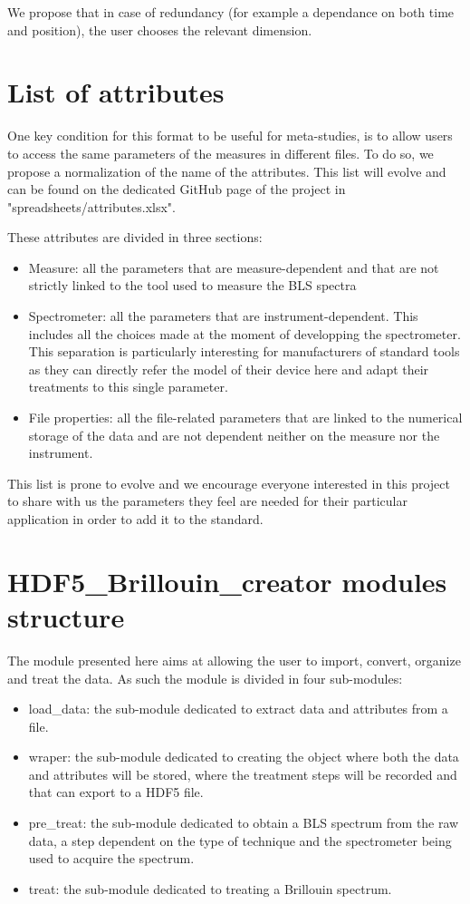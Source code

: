 \documentclass[11pt]{article}
\begin{document}
  We propose that in case of redundancy (for example a dependance on both time and position), the user chooses the relevant dimension.

\section{List of attributes}

One key condition for this format to be useful for meta-studies, is to allow users to access the same parameters of the measures in different files. To do so, we propose a normalization of the name of the attributes. This list will evolve and can be found on the dedicated GitHub page of the project in "spreadsheets/attributes.xlsx".

These attributes are divided in three sections:
\begin{itemize}
  \item Measure: all the parameters that are measure-dependent and that are not strictly linked to the tool used to measure the BLS spectra
  \item Spectrometer: all the parameters that are instrument-dependent. This includes all the choices made at the moment of developping the spectrometer. This separation is particularly interesting for manufacturers of standard tools as they can directly refer the model of their device here and adapt their treatments to this single parameter. 
  \item File properties: all the file-related parameters that are linked to the numerical storage of the data and are not dependent neither on the measure nor the instrument.
\end{itemize}

This list is prone to evolve and we encourage everyone interested in this project to share with us the parameters they feel are needed for their particular application in order to add it to the standard. 

\section{HDF5\_Brillouin\_creator modules structure}

    The module presented here aims at allowing the user to import, convert, organize and treat the data. As such the module is divided in four sub-modules:
    \begin{itemize}
      \item load\_data: the sub-module dedicated to extract data and attributes from a file.
      \item wraper: the sub-module dedicated to creating the object where both the data and attributes will be stored, where the treatment steps will be recorded and that can export to a HDF5 file.
      \item pre\_treat: the sub-module dedicated to obtain a BLS spectrum from the raw data, a step dependent on the type of technique and the spectrometer being used to acquire the spectrum.
      \item treat: the sub-module dedicated to treating a Brillouin spectrum.
    \end{itemize}
\end{document}
